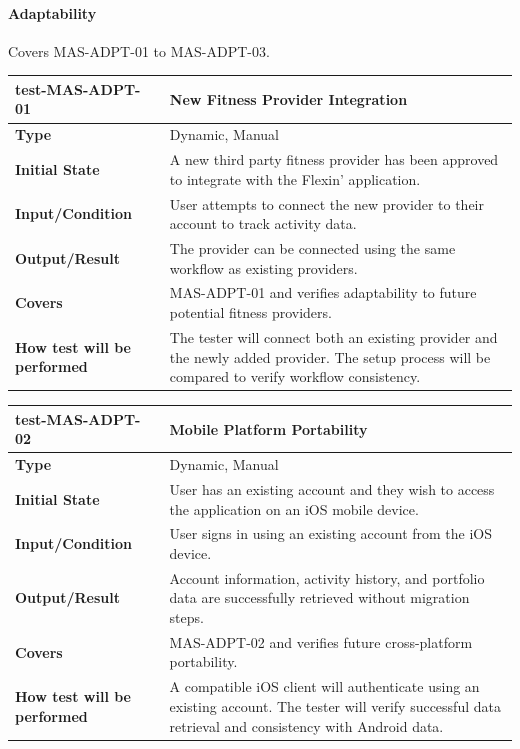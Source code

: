 \documentclass[12pt, titlepage]{article}
\begin{document}
\paragraph{Adaptability}

Covers MAS-ADPT-01 to MAS-ADPT-03.

\noindent\begin{tabularx}{\textwidth}{>{\raggedright\arraybackslash}p{3.5cm}X}
  \toprule
  \textbf{test-MAS-ADPT-01} & \textbf{New Fitness Provider Integration}\\
  \midrule
  \textbf{Type} & Dynamic, Manual\\
  \textbf{Initial State} & A new third party fitness provider has been approved to integrate with the Flexin' application.\\
  \textbf{Input/Condition} & User attempts to connect the new provider to their account to track activity data.\\
  \textbf{Output/Result} & The provider can be connected using the same workflow as existing providers.\\
  \textbf{Covers} & MAS-ADPT-01 and verifies adaptability to future potential fitness providers.\\
  \textbf{How test will be performed} & The tester will connect both an existing provider and the newly added provider. The setup process will be compared to verify workflow consistency.\\
  \bottomrule
\end{tabularx}

\vspace{1em}

\noindent\begin{tabularx}{\textwidth}{>{\raggedright\arraybackslash}p{3.5cm}X}
  \toprule
  \textbf{test-MAS-ADPT-02} & \textbf{Mobile Platform Portability}\\
  \midrule
  \textbf{Type} & Dynamic, Manual\\
  \textbf{Initial State} & User has an existing account and they wish to access the application on an iOS mobile device.\\
  \textbf{Input/Condition} & User signs in using an existing account from the iOS device.\\
  \textbf{Output/Result} & Account information, activity history, and portfolio data are successfully retrieved without migration steps.\\
  \textbf{Covers} & MAS-ADPT-02 and verifies future cross-platform portability.\\
  \textbf{How test will be performed} & A compatible iOS client will authenticate using an existing account. The tester will verify successful data retrieval and consistency with Android data.\\
  \bottomrule
\end{tabularx}
\end{document}
